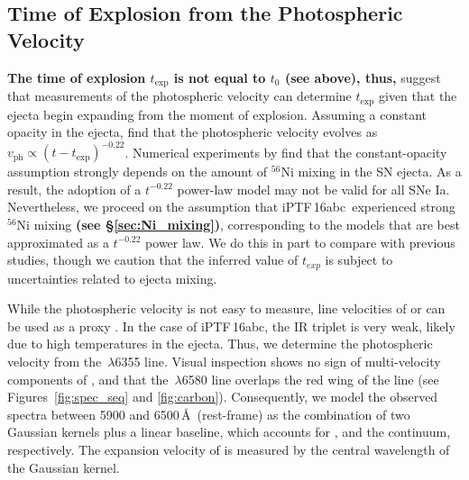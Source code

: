 \documentclass[twocolumn]{aastex61}
\newcommand{\abc}{iPTF\,16abc}
\begin{document}
\subsection{Time of Explosion from the Photospheric Velocity}
\label{sec:early_vel}

\textbf{The time of explosion $t_\mathrm{exp}$ is not equal to $t_0$ (see
above), thus,} \citet{2014ApJ...784...85P} suggest that measurements of the
photospheric velocity can determine $t_\mathrm{exp}$ given that the ejecta
begin expanding from the moment of explosion. Assuming a constant opacity in
the ejecta, \citeauthor{2014ApJ...784...85P} find that the photospheric
velocity evolves as $v_\mathrm{ph}\propto(t-t_\mathrm{exp})^{-0.22}$.
Numerical experiments by \citet{2016ApJ...826...96P} find that the
constant-opacity assumption strongly depends on the amount of $^{56}$Ni mixing
in the SN ejecta. As a result, the adoption of a $t^{-0.22}$ power-law model
may not be valid for all SNe Ia. Nevertheless, we proceed on the assumption
that \abc\ experienced strong $^{56}$Ni mixing \textbf{(see
\S\ref{sec:Ni_mixing})}, corresponding to the models that are best
approximated as a $t^{-0.22}$ power law. We do this in part to compare with
previous studies, though we caution that the inferred value of $t_{exp}$ is
subject to uncertainties related to ejecta mixing.

While the photospheric velocity is not easy to measure, line velocities of
 or  can be used as a proxy
\citep{2014ApJ...784...85P,2016ApJ...826..144S}. In the case of \abc, the
 IR triplet is very weak, likely due to high temperatures in the
ejecta. Thus, we determine the photospheric velocity from the
\,$\lambda$6355 line. Visual inspection shows no sign of
multi-velocity components of , and that the
\,$\lambda$6580 line overlaps the red wing of the  line
(see Figures~\ref{fig:spec_seq} and \ref{fig:carbon}). Consequently, we model
the observed spectra between 5900 and 6500\,\AA\ (rest-frame) as the
combination of two Gaussian kernels plus a linear baseline, which accounts for
,  and the continuum, respectively. The expansion
velocity of  is measured by the central wavelength of the
 Gaussian kernel.
\end{document}
